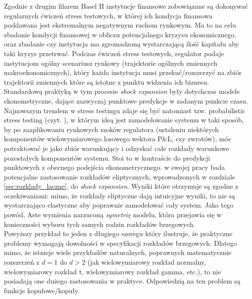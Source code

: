 Zgodnie z drugim filarem Basel II instytucje finansowe zobowiązane są dokonywać regularnych ćwiczeń stress testowych, w której ich kondycja finansowa poddawana jest ekstremalnym negatywnym ruchom rynkowym. Ma to na celu zbadanie kondycji finansowej w obliczu potencjalnego kryzysu ekonomicznego, oraz zbadanie czy instytucja ma zgromadzoną wystarczającą ilość kapitału aby taki kryzys przetrwać. Podczas ćwiczeń stress testowych, regulator podaje instytucjom ogólny scenariusz rynkowy (trajektorie ogólnych zmiennych makroekonomicznych), który każda instytucja musi przekuć/rozszerzyć na zbiór trajektorii zmiennych które są istotne z punktu widzenia ich biznesu. Standardową praktyką w tym procesie \emph{shock expansion} były dotychczas modele ekonometryczne, dające zazwyczaj punktowe predykcje w zadanym punkcie czasu.\\
Najnowszym trendem w stress testingu zdaje się być natomiast tzw. probabilistic stress testing (czyt. \cite{Aste_Probabilistic_Stress_Testing}), w którym ideą jest zamodelowanie systemu w taki sposób, by po zaaplikowaniu rynkowych szoków regulatora (ustaleniu niektórych komponentów wielowymiarowego losowego wektora P\&L, czy zwrotów), móc potraktować je jako zbiór warunkujący i odzyskać całe rozkłady warunkowe pozostałych komponentów systemu. Stoi to w kontraście do predykcji punktowych z obecnego podejścia ekonometrycznego. \cite{Aste_Probabilistic_Stress_Testing} w swojej pracy bada potencjalne zastosowanie rozkładów eliptycznych, wprowadzonych w rozdziale \ref{sec:rozklady_laczne}, do \emph{shock expansion}. Wyniki które otrzymuje są zgodne z oczekiwaniami: mimo, że rozkłady eliptyczne dają intuicyjne wyniki, to nie są wystarczająco elastyczne aby poprawnie zamodelować cały system. Jako tego powód, Aste wymienia narzuconą \textit{symetrię} modelu, która przejawia się w konieczności wyboru tych samych rodzin rozkładów brzegowych.\\

Powyższy przykład to jeden z długiego szeregu który ilustruje, że praktyczne problemy wymagają dowolności w specyfikacji rozkładów brzegowych. Dlatego mimo, że istnieje wiele przykładów naturalnych, poprawnych matematycznie rozszerzeń z $d=1$ do $d>2$ (jak wielowymiarowy rozkład normalny, wielowymiarowy rozkład t, wielowymiarowy rozkład gamma, etc.), to nie posiadają one dużego zastosowania w praktyce. Odpowiedzią na ten problem są funkcje kopułowe/kopuły.\\

